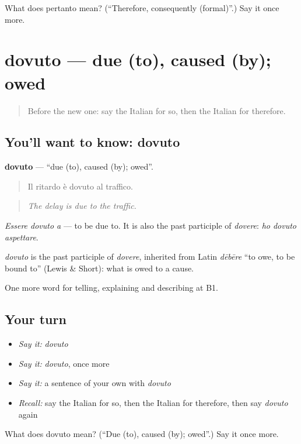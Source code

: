 \begin{tcolorbox}[breakable,colback=teal!4,colframe=teal!35!black,title={Before you move on}]
What does pertanto mean? (\textquotedblleft{}Therefore, consequently (formal)\textquotedblright{}.) Say it once more.
\end{tcolorbox}
\section[dovuto]{dovuto — due (to), caused (by); owed}

\label{lesson:IT-C350-dovuto}



\begin{quote}
Before the new one: say the Italian for so, then the Italian for therefore.
\end{quote}

\subsection*{You'll want to know: dovuto}
\textbf{dovuto} — \textquotedblleft{}due (to), caused (by); owed\textquotedblright{}.

\begin{quote}
Il ritardo è dovuto al traffico.
\end{quote}

\begin{quote}
\emph{The delay is due to the traffic.}
\end{quote}

\emph{Essere dovuto a} — to be due to. It is also the past participle of \emph{dovere}: \emph{ho dovuto aspettare}.

\begin{cousinweb}
\emph{dovuto} is the past participle of \emph{dovere}, inherited from Latin \emph{dēbēre} \textquotedblleft{}to owe, to be bound to\textquotedblright{} (Lewis \& Short): what is owed to a cause.
\end{cousinweb}

\begin{grammarlens}[title={What you've built}]
One more word for telling, explaining and describing at B1.
\end{grammarlens}

\subsection*{Your turn}
\begin{itemize}
\raggedright
  \item \emph{Say it:} \emph{dovuto}
  \item \emph{Say it:} \emph{dovuto}, once more
  \item \emph{Say it:} a sentence of your own with \emph{dovuto}
  \item \emph{Recall:} say the Italian for so, then the Italian for therefore, then say \emph{dovuto} again
\end{itemize}

\begin{tcolorbox}[breakable,colback=teal!4,colframe=teal!35!black,title={Before you move on}]
What does dovuto mean? (\textquotedblleft{}Due (to), caused (by); owed\textquotedblright{}.) Say it once more.
\end{tcolorbox}
